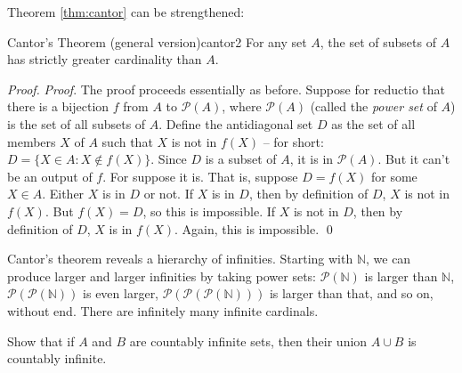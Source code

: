 Theorem \ref{thm:cantor} can be strengthened:

\begin{theorem}{Cantor's Theorem (general version)}{cantor2}
  For any set $A$,
  the set of subsets of $A$ has strictly greater cardinality than $A$.
\end{theorem}

\begin{proof}
  \emph{Proof}.
  The proof proceeds essentially as before.
  Suppose for reductio that there is a bijection $f$ from  $A$ to $\mathcal{P}(A)$,
  where $\mathcal{P}(A)$ (called the \emph{power set} of $A$)
  is the set of all subsets of $A$.
  Define the antidiagonal set $D$ as
  the set of all members $X$ of $A$ such that $X$ is not in $f(X)$
  -- for short: $D = \{ X \in A : X \notin f(X) \}$.
  Since $D$ is a subset of $A$,
  it is in $\mathcal{P}(A)$.
  But it can't be an output of $f$.
  For suppose it is.
  That is,
  suppose $D = f(X)$ for some $X \in A$.
  Either $X$ is in $D$ or not.
  If $X$ is in $D$,
  then by definition of $D$,
  $X$ is not in $f(X)$.
  But $f(X) = D$,
  so this is impossible.
  If $X$ is not in $D$,
  then by definition of $D$,
  $X$ is in $f(X)$.
  Again, this is impossible.
  \qed
\end{proof}


Cantor's theorem reveals a hierarchy of infinities.
Starting with $\mathbb{N}$,
we can produce larger and larger infinities by taking power sets:
$\mathcal{P}(\mathbb{N})$ is larger than $\mathbb{N}$,
$\mathcal{P}(\mathcal{P}(\mathbb{N}))$ is even larger,
$\mathcal{P}(\mathcal{P}(\mathcal{P}(\mathbb{N})))$ is larger than that,
and so on,
without end.
There are infinitely many infinite cardinals.


\begin{exercise}
  Show that if $A$ and $B$ are countably infinite sets, then their union $A \cup B$ is countably infinite.
\end{exercise}

